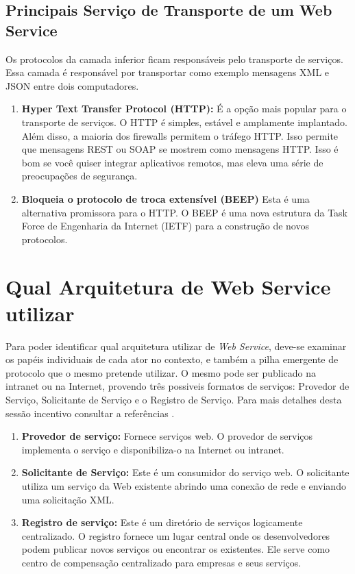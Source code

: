 \documentclass[12pt]{article}
\begin{document}
 \subsection {Principais Serviço de Transporte de um Web Service}Os protocolos da camada inferior ficam responsáveis pelo transporte de serviços. Essa camada é responsável por transportar como exemplo mensagens XML e JSON entre dois computadores.
 \begin{enumerate}
 	\item \textbf{Hyper Text Transfer Protocol (HTTP):}
 	É a opção mais popular para o transporte de serviços. O HTTP é simples, estável e amplamente implantado. Além disso, a maioria dos firewalls permitem o tráfego HTTP. Isso permite que mensagens REST ou SOAP se mostrem como mensagens HTTP. Isso é bom se você quiser integrar aplicativos remotos, mas eleva uma série de preocupações de segurança.
 	\item \textbf{Bloqueia o protocolo de troca extensível (BEEP)}
 	Esta é uma alternativa promissora para o HTTP. O BEEP é uma nova estrutura da Task Force de Engenharia da Internet (IETF) para a construção de novos protocolos.
 \end{enumerate}
 
\section{Qual Arquitetura de Web Service utilizar}
Para poder identificar qual arquitetura utilizar de \textit{Web Service}, deve-se examinar os papéis individuais de cada ator no contexto, e também a pilha emergente de protocolo que o mesmo pretende utilizar.
O mesmo pode ser publicado na intranet ou na Internet, provendo três possiveis formatos de serviços: Provedor de Serviço, Solicitante de Serviço e o Registro de Serviço.
Para mais detalhes desta sessão incentivo consultar a referências \cite{tutorial}. 

\begin{enumerate}
	\item \textbf{Provedor de serviço:}
	Fornece serviços web. O provedor de serviços implementa o serviço e disponibiliza-o na Internet ou intranet.
	\item \textbf{Solicitante de Serviço:}
	Este é um consumidor do serviço web. O solicitante utiliza um serviço da Web existente abrindo uma conexão de rede e enviando uma solicitação XML.
	\item \textbf{Registro de serviço:}
	Este é um diretório de serviços logicamente centralizado. O registro fornece um lugar central onde os desenvolvedores podem publicar novos serviços ou encontrar os existentes. Ele serve como centro de compensação centralizado para empresas e seus serviços.
\end{enumerate}
\end{document}
